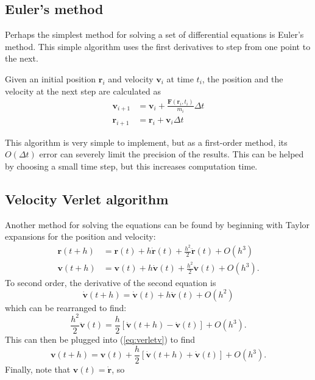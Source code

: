 \documentclass[aps,prc,reprint,nobalancelastpage]{revtex4-1}
\begin{document}
    \subsection{Euler's method}
    \label{sub:euler}

        Perhaps the simplest method for solving a set of differential equations is Euler's method. This simple algorithm uses the first derivatives to step from one point to the next.

        Given an initial position $\mathbf{r}_i$ and velocity $\mathbf{v}_i$ at time $t_i$, the position and the velocity at the next step are calculated as
        \begin{align}
            \mathbf{v}_{i+1} &= \mathbf{v}_i + \frac{\mathbf{F}(\mathbf{r}_i, t_i)}{m_i} \Delta t \\
            \mathbf{r}_{i+1} &= \mathbf{r}_i + \mathbf{v}_i \Delta t
        \end{align}

        This algorithm is very simple to implement, but as a first-order method, its $O(\Delta t)$ error can severely limit the precision of the results. This can be helped by choosing a small time step, but this increases computation time.

    \subsection{Velocity Verlet algorithm}
    \label{sub:verlet}

        Another method for solving the equations can be found by beginning with Taylor expansions for the position and velocity:
        \begin{align}
            \mathbf{r}(t+h) &= \mathbf{r}(t) + h \dot{\mathbf{r}}(t) + \frac{h^2}{2}\ddot{\mathbf{r}}(t) + O(h^3) \\
            \mathbf{v}(t+h) &= \mathbf{v}(t) + h \dot{\mathbf{v}}(t) + \frac{h^2}{2}\ddot{\mathbf{v}}(t) + O(h^3). \label{eq:verletv}
        \end{align}
        To second order, the derivative of the second equation is
        \begin{equation}
            \dot{\mathbf{v}}(t+h) = \dot{\mathbf{v}}(t) + h \ddot{\mathbf{v}}(t) + O(h^2)
        \end{equation}
        which can be rearranged to find:
        \begin{equation}
            \frac{h^2}{2}\ddot{\mathbf{v}}(t) = \frac{h}{2} [\dot{\mathbf{v}}(t+h) - \dot{\mathbf{v}}(t)] + O(h^3).
        \end{equation}
        This can then be plugged into (\ref{eq:verletv}) to find
        \begin{equation}
            \mathbf{v}(t+h) = \mathbf{v}(t) + \frac{h}{2} [\dot{\mathbf{v}}(t+h) + \dot{\mathbf{v}}(t)] + O(h^3).
        \end{equation}
        Finally, note that $\mathbf{v}(t) = \dot{\mathbf{r}}$, so
\end{document}

